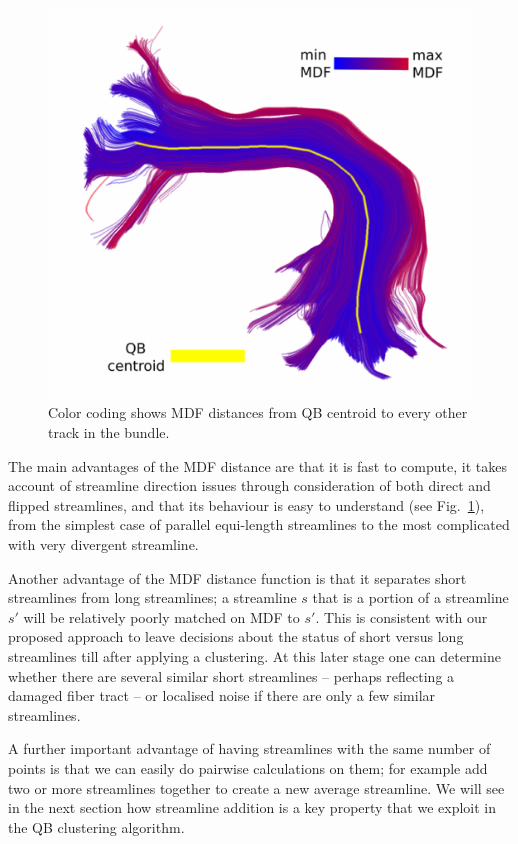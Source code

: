 \documentclass{bioinfo}
\begin{document}
\begin{methods}
\begin{figure}
\includegraphics[scale=0.15]{Figures/Fig_11_MDF_arcuate}
\centering{}
\caption{Color coding shows MDF distances from QB centroid to every
  other track in the bundle.\label{Flo:MDF_arcuate}}
\end{figure}


The main advantages of the MDF distance are that it is fast to compute,
it takes account of streamline direction issues through consideration of
both direct and flipped streamlines, and that its behaviour is easy to
understand (see Fig.~\ref{Flo:MDF_arcuate}), from the simplest case of
parallel equi-length streamlines to the most complicated with very
divergent streamline.

Another advantage of the MDF distance function is that it separates
short streamlines from long streamlines; a streamline $s$ that is a
portion of a streamline $s'$ will be relatively poorly matched on MDF to
$s'$. This is consistent with our proposed approach to leave decisions
about the status of short versus long streamlines till after applying a
clustering. At this later stage one can determine whether there are
several similar short streamlines -- perhaps reflecting a damaged fiber
tract -- or localised noise if there are only a few similar streamlines.

A further important advantage of having streamlines with the same number
of points is that we can easily do pairwise calculations on them; for
example add two or more streamlines together to create a new average
streamline. We will see in the next section how streamline addition is a
key property that we exploit in the QB clustering algorithm.


\end{methods}
\end{document}

